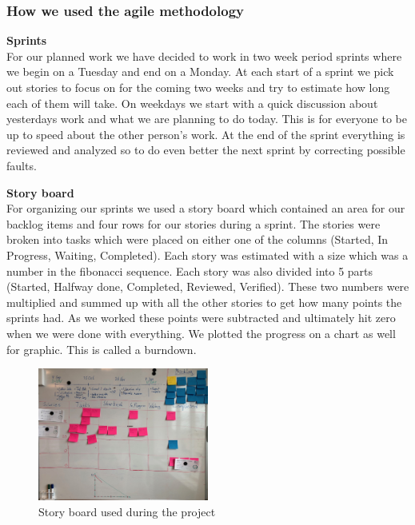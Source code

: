 \cite{extremeProgramming}


\subsubsection{How we used the agile methodology}
\textbf{Sprints} \\
For our planned work we have decided to work in two week period sprints where we begin on a Tuesday and end on a Monday. At each start of a sprint we pick out stories to focus on for the coming two weeks and try to estimate how long each of them will take.
On weekdays we start with a quick discussion about yesterdays work and what we are planning to do today. This is for everyone to be up to speed about the other person's work.
At the end of the sprint everything is reviewed and analyzed so to do even better the next sprint by correcting possible faults.

\textbf{Story board} \\
For organizing our sprints we used a story board which contained an area for our backlog items and four rows for our stories during a sprint. The stories were broken into tasks which were placed on either one of the columns (Started, In Progress, Waiting, Completed).
Each story was estimated with a size which was a number in the fibonacci sequence. Each story was also divided into 5 parts (Started, Halfway done, Completed, Reviewed, Verified). These two numbers were multiplied and summed up with all the other stories to get how many points the sprints had. As we worked these points were subtracted and ultimately hit zero when we were done with everything. We plotted the progress on a chart as well for graphic. This is called a burndown.

\begin{figure}[hbtp]
\begin{center}
\includegraphics[width = 0.5\textwidth]{./Images/story_board.jpg} 
\caption{Story board used during the project}
\end{center}
\end{figure}


